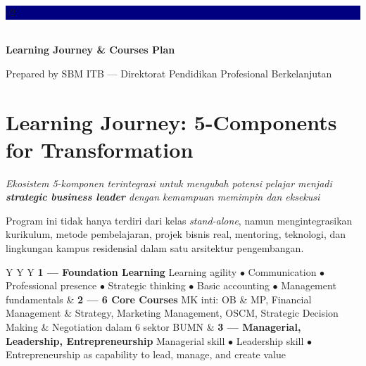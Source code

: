 \documentclass[10pt]{article}
\begin{document}
\begin{center}
\vspace*{2.2cm}
{\fontsize{42}{48}\selectfont\bfseries\color{white}\colorbox{navy}{\strut 02}}\\[1.2cm]
{\fontsize{34}{40}\selectfont\bfseries\color{navy}Learning Journey \& Courses Plan}
\end{center}

\vspace{1.2cm}
\begin{tcolorbox}[colback=navy,colframe=navy,arc=3mm]
\centering\color{white}\Large
Prepared by SBM ITB --- Direktorat Pendidikan Profesional Berkelanjutan
\end{tcolorbox}

\section{Learning Journey: 5-Components for Transformation}

\emph{Ekosistem 5-komponen terintegrasi untuk mengubah potensi pelajar menjadi \textbf{strategic business leader} dengan kemampuan memimpin dan eksekusi}

\begin{tcolorbox}[colback=paleblue,colframe=navy,title=Integrated Design Logic,
  fonttitle=\Large\bfseries,arc=2mm]
Program ini tidak hanya terdiri dari kelas \emph{stand-alone}, namun mengintegrasikan kurikulum, metode pembelajaran, projek bisnis real, mentoring, teknologi, dan lingkungan kampus residensial dalam satu arsitektur pengembangan.
\end{tcolorbox}

\begin{tcolorbox}[colback=palered!55,colframe=brick,
  title={\Large 1 \quad Desain Kurikulum\quad\small\itshape 3 Learning Building Blocks},fonttitle=\bfseries]
\begin{tabularx}{\linewidth}{Y Y Y}
\textbf{1 --- Foundation Learning}\newline
Learning agility $\bullet$ Communication $\bullet$ Professional presence $\bullet$ Strategic thinking $\bullet$ Basic accounting $\bullet$ Management fundamentals
&
\textbf{2 --- 6 Core Courses} MK inti: OB \& MP, Financial Management \& Strategy, Marketing Management, OSCM, Strategic Decision Making \& Negotiation dalam 6 sektor BUMN
&
\textbf{3 --- Managerial, Leadership, Entrepreneurship}\newline
Managerial skill $\bullet$ Leadership skill $\bullet$ Entrepreneurship as capability to lead, manage, and create value
\end{tabularx}
\end{tcolorbox}
\end{document}
